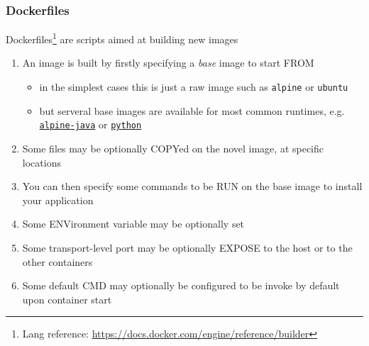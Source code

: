 \documentclass[presentation]{beamer}\mode<presentation>{\usetheme{AMSBolognaFC}}
\begin{document}
\begin{frame}%
\frametitle{Dockerfiles}

    Dockerfiles\footnote{Lang reference: \url{https://docs.docker.com/engine/reference/builder}} are scripts aimed at \alert{building} new images
    \begin{enumerate}
        \item An image is built by firstly specifying a \emph{base} image to start \alert{FROM}
        \begin{itemize}
            \item in the simplest cases this is just a raw image such as \texttt{alpine} or \texttt{ubuntu}
            \item but serveral base images are available for most common runtimes, e.g. \href{https://hub.docker.com/r/anapsix/alpine-java/}{\texttt{alpine-java}} or \href{https://hub.docker.com/_/python/}{\texttt{python}}
        \end{itemize}
        \item Some files may be optionally \alert{COPY}ed on the novel image, at specific locations
        \item You can then specify some commands to be \alert{RUN} on the base image to install your application
        \item Some \alert{ENV}ironment variable may be optionally set
        \item Some transport-level port may be optionally \alert{EXPOSE} to the host or to the other containers
        \item Some default \alert{CMD} may optionally be configured to be invoke by default upon container start

    \end{enumerate}

\end{frame}
\end{document}
